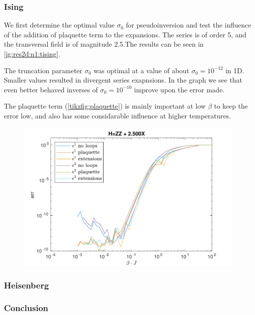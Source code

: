 \subsubsection{Ising}

We first determine the optimal value $\sigma_0$ for pseudoinversion and test the influence of the addition of plaquette term to the expansions. The series is of order 5, and the transversal field is of magnitude 2.5.The results can be seen in \cref{ig:res2d:n1:tising}.

The truncation parameter $\sigma_0$ was optimal at a value of about $\sigma_0=10^{-12}$ in 1D. Smaller values resulted in divergent series exapnsions. In the graph we see that even better behaved inverses of $\sigma_0=10^{-10}$ improve upon the error made.

The plaquette term (\cref{tikzfig:plaquette}) is mainly important at low $\beta$ to keep the error low, and also has some considarable influence at higher temperatures.

\begin{figure}
  \center
  \includegraphics[width=\textwidth]{Figuren/benchmarking/2D_Err01_t_sing.pdf}
  \caption{ }
  \label{fig:res2d:n1:tising}
\end{figure}

\subsubsection{Heisenberg}

\subsubsection{Conclusion}

